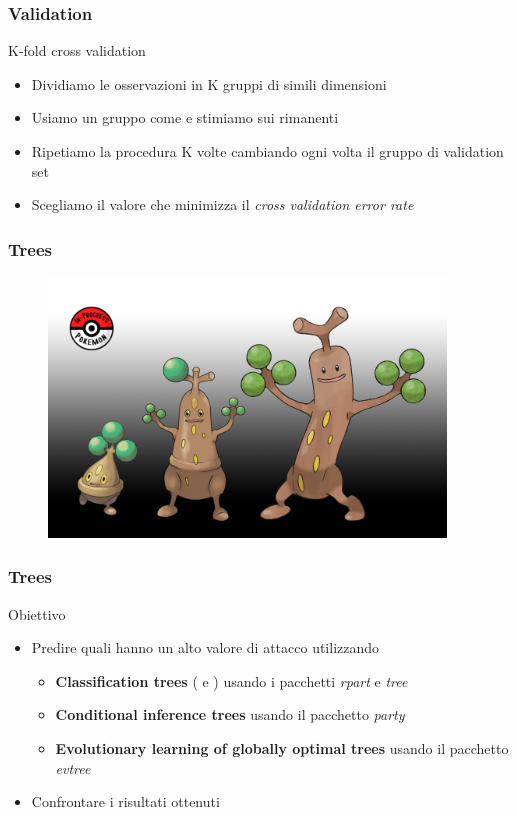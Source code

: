 	\begin{frame}
		\frametitle{Validation}
		\begin{block}{K-fold cross validation}
			\begin{itemize}
				\item Dividiamo le osservazioni in K gruppi di simili dimensioni
				\item Usiamo un gruppo come  e stimiamo sui rimanenti
				\item Ripetiamo la procedura K volte cambiando ogni volta il gruppo di validation set
				\item Scegliamo il valore che minimizza il \emph{cross validation error rate}
			\end{itemize}
		\end{block}
	\end{frame}

	\begin{frame}
		\frametitle{Trees}	
		\begin{center}
			\begin{figure}
				\includegraphics[width=0.94\textwidth]{img/pokpianta}
			\end{figure}
		\end{center}
	\end{frame}

	\begin{frame}
		\frametitle{Trees}	
		\begin{block}{Obiettivo}
			\begin{itemize}
				\item Predire quali \pok hanno un alto valore di attacco utilizzando
				\begin{itemize}
					\item \textbf{Classification trees} ( e ) usando i pacchetti \emph{rpart} e \emph{tree}
					\item \textbf{Conditional inference trees} usando il pacchetto \emph{party}
					\item \textbf{Evolutionary learning of globally optimal trees} usando il pacchetto \emph{evtree}
				\end{itemize}
				\item Confrontare i risultati ottenuti
			\end{itemize}
		\end{block}		
	\end{frame}

